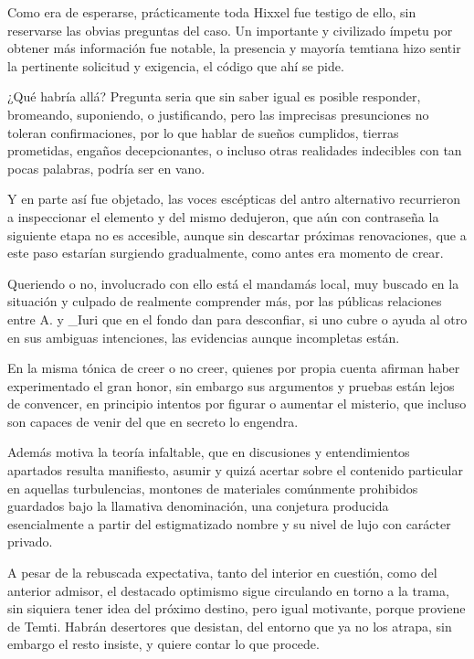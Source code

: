 \documentclass[
]{book}
\begin{document}
Como era de esperarse, prácticamente toda Hixxel fue testigo de ello, sin reservarse las obvias preguntas del caso. Un importante y civilizado ímpetu por obtener más información fue notable, la presencia y mayoría temtiana hizo sentir la pertinente solicitud y exigencia, el código que ahí se pide.

¿Qué habría allá? Pregunta seria que sin saber igual es posible responder, bromeando, suponiendo, o justificando, pero las imprecisas presunciones no toleran confirmaciones, por lo que hablar de sueños cumplidos, tierras prometidas, engaños decepcionantes, o incluso otras realidades indecibles con tan pocas palabras, podría ser en vano.

Y en parte así fue objetado, las voces escépticas del antro alternativo recurrieron a inspeccionar el elemento y del mismo dedujeron, que aún con contraseña la siguiente etapa no es accesible, aunque sin descartar próximas renovaciones, que a este paso estarían surgiendo gradualmente, como antes era momento de crear.

Queriendo o no, involucrado con ello está el mandamás local, muy buscado en la situación y culpado de realmente comprender más, por las públicas relaciones entre A. y \_Iuri que en el fondo dan para desconfiar, si uno cubre o ayuda al otro en sus ambiguas intenciones, las evidencias aunque incompletas están.

En la misma tónica de creer o no creer, quienes por propia cuenta afirman haber experimentado el gran honor, sin embargo sus argumentos y pruebas están lejos de convencer, en principio intentos por figurar o aumentar el misterio, que incluso son capaces de venir del que en secreto lo engendra.

Además motiva la teoría infaltable, que en discusiones y entendimientos apartados resulta manifiesto, asumir y quizá acertar sobre el contenido particular en aquellas turbulencias, montones de materiales comúnmente prohibidos guardados bajo la llamativa denominación, una conjetura producida esencialmente a partir del estigmatizado nombre y su nivel de lujo con carácter privado.

A pesar de la rebuscada expectativa, tanto del interior en cuestión, como del anterior admisor, el destacado optimismo sigue circulando en torno a la trama, sin siquiera tener idea del próximo destino, pero igual motivante, porque proviene de Temti. Habrán desertores que desistan, del entorno que ya no los atrapa, sin embargo el resto insiste, y quiere contar lo que procede.
\end{document}
